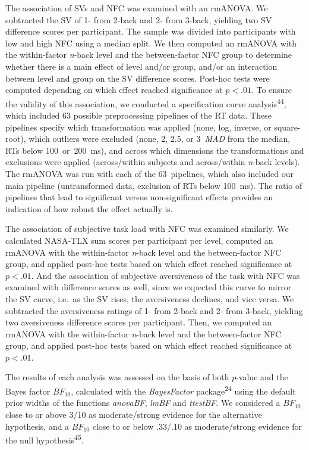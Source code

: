 \documentclass[
  man,floatsintext]{apa6}
\begin{document}
The association of SVs and NFC was examined with an rmANOVA.
We subtracted the SV of 1- from 2-back and 2- from 3-back, yielding two SV difference scores per participant.
The sample was divided into participants with low and high NFC using a median split.
We then computed an rmANOVA with the within-factor \emph{n}-back level and the between-factor NFC group to determine whether there is a main effect of level and/or group, and/or an interaction between level and group on the SV difference scores.
Post-hoc tests were computed depending on which effect reached significance at \(p<.01\).
To ensure the validity of this association, we conducted a specification curve analysis\textsuperscript{44}, which included 63 possible preprocessing pipelines of the RT data.
These pipelines specify which transformation was applied (none, log, inverse, or square-root), which outliers were excluded (none, 2, 2.5, or 3~\emph{MAD} from the median, RTs below 100~or~200~ms), and across which dimensions the transformations and exclusions were applied (across/within subjects and across/within \emph{n}-back levels).
The rmANOVA was run with each of the 63~pipelines, which also included our main pipeline (untransformed data, exclusion of RTs below 100~ms).
The ratio of pipelines that lead to significant versus non-significant effects provides an indication of how robust the effect actually is.

The association of subjective task load with NFC was examined similarly.
We calculated NASA-TLX sum scores per participant per level, computed an rmANOVA with the within-factor \emph{n}-back level and the between-factor NFC group, and applied post-hoc tests based on which effect reached significance at \(p<.01\).
And the association of subjective aversiveness of the task with NFC was examined with difference scores as well, since we expected this curve to mirror the SV curve, i.e.~as the SV rises, the aversiveness declines, and vice versa.
We subtracted the aversiveness ratings of 1- from 2-back and 2- from 3-back, yielding two aversiveness difference scores per participant.
Then, we computed an rmANOVA with the within-factor \emph{n}-back level and the between-factor NFC group, and applied post-hoc tests based on which effect reached significance at \(p<.01\).

The results of each analysis was assessed on the basis of both \(p\)-value and the Bayes factor \(BF_{10}\), calculated with the \emph{BayesFactor} package\textsuperscript{24} using the default prior widths of the functions \emph{anovaBF}, \emph{lmBF} and \emph{ttestBF}.
We considered a \(BF_{10}\) close to or above 3/10 as moderate/strong evidence for the alternative hypothesis, and a \(BF_{10}\) close to or below .33/.10 as moderate/strong evidence for the null hypothesis\textsuperscript{45}.
\end{document}
